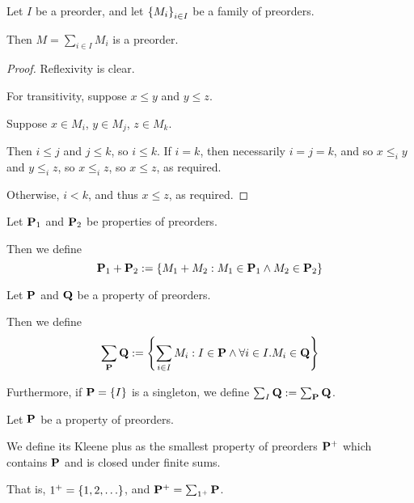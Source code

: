 \begin{lemma}
  Let $I$ be a preorder, and let $\left\{ {M_i} \right\}_{i \in I}$ be a family of preorders.

  Then $M = \sum_{i \in I} M_i$ is a preorder.
\end{lemma}

\begin{proof}
  Reflexivity is clear.

  For transitivity, suppose $x \le y$ and $y \le z$.

  Suppose $x \in M_i$, $y \in M_j$, $z \in M_k$.

  Then $i \le j$ and $j \le k$, so $i \le k$.
  If $i = k$, then necessarily $i = j = k$, and so $x \le_i y$ and $y \le_i z$,
  so $x \le_i z$, so $x \le z$, as required.

  Otherwise, $i < k$, and thus $x \le z$, as required.
\end{proof}

\begin{definition}
  Let $\mathbf{P}_1$ and $\mathbf{P}_2$ be properties of preorders.

  Then we define
  \[
    \mathbf{P}_1 + \mathbf{P}_2 := \left\{ {M_1 + M_2 : M_1 \in \mathbf{P}_1 \wedge M_2 \in \mathbf{P}_2} \right\}
  \]
\end{definition}

\begin{definition}
  Let $\mathbf{P}$ and $\mathbf{Q}$ be a property of preorders.

  Then we define
  \[
    \sum_{\mathbf{P}}{\mathbf{Q}} := \left\{ {\sum_{i \in I}{M_i} : I \in \mathbf{P} \wedge \forall i \in I. M_i \in \mathbf{Q}} \right\}
  \]

  Furthermore, if $\mathbf{P} = \left\{ {I} \right\}$ is a singleton, we define $\sum_{I}{\mathbf{Q}} := \sum_{\mathbf{P}}{\mathbf{Q}}$.
\end{definition}

\begin{definition}
  Let $\mathbf{P}$ be a property of preorders.

  We define its Kleene plus as the smallest property of preorders $\mathbf{P}^+$ which contains $\mathbf{P}$ and is closed under
  finite sums.

  That is, $1^+ = \left\{ {1, 2, \ldots} \right\}$, and $\mathbf{P}^+ = \sum_{1^+}{\mathbf{P}}$.
\end{definition}

